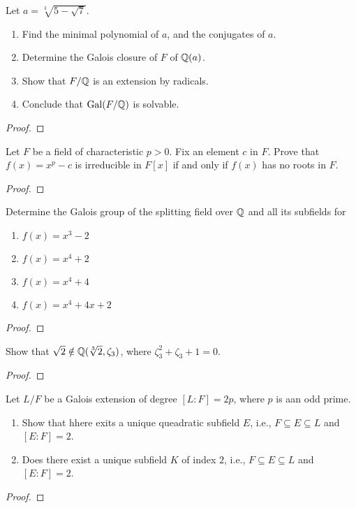 \begin{problem}
Let $a=\sqrt[3]{5-\sqrt{7}}$.
\begin{enumerate}[label=(\alph*)]
\item Find the minimal polynomial of $a$, and the conjugates of $a$.
\item Determine the Galois closure of $F$ of $\mathbb{Q}(a)$.
\item Show that $F/\mathbb{Q}$ is an extension by radicals.
\item Conclude that $\operatorname{Gal}(F/\mathbb{Q})$ is solvable.
\end{enumerate}
\end{problem}
\begin{proof}
\end{proof}

\begin{problem}
Let $F$ be a field of characteristic $p>0$. Fix an element $c$ in
$F$. Prove that $f(x)=x^p-c$ is irreducible in $F[x]$ if and only if $f(x)$
has no roots in $F$.
\end{problem}
\begin{proof}
\end{proof}

\begin{problem}
Determine the Galois group of the splitting field over $\mathbb{Q}$ and all its
subfields for
\begin{enumerate}[label=(\alph*)]
\item $f(x)=x^3-2$
\item $f(x)=x^4+2$
\item $f(x)=x^4+4$
\item $f(x)=x^4+4x+2$
\end{enumerate}
\end{problem}
\begin{proof}
\end{proof}

\begin{problem}
Show that $\sqrt{2}\notin\mathbb{Q}(\sqrt[3]{2},\zeta_3)$, where
$\zeta_3^2+\zeta_3+1=0$.
\end{problem}
\begin{proof}
\end{proof}

\begin{problem}
Let $L/F$ be a Galois extension of degree $[L:F]=2p$, where $p$ is aan odd
prime.
\begin{enumerate}[label=(\alph*)]
\item Show that hhere exits a unique queadratic subfield $E$, i.e.,
  $F\subseteq E\subseteq L$ and $[E:F]=2$.
\item Does there exist a unique subfield $K$ of index $2$, i.e.,
  $F\subseteq E\subseteq L$ and $[E:F]=2$.
\end{enumerate}
\end{problem}
\begin{proof}
\end{proof}

